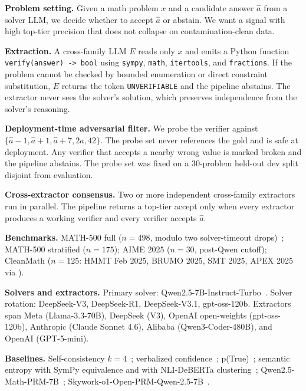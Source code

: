 \documentclass{article}
\begin{document}
\textbf{Problem setting.} Given a math problem $x$ and a candidate answer $\hat a$ from a solver LLM, we decide whether to accept $\hat a$ or abstain. We want a signal with high top-tier precision that does not collapse on contamination-clean data.

\textbf{Extraction.} A cross-family LLM $E$ reads only $x$ and emits a Python function \texttt{verify(answer) -> bool} using \texttt{sympy}, \texttt{math}, \texttt{itertools}, and \texttt{fractions}. If the problem cannot be checked by bounded enumeration or direct constraint substitution, $E$ returns the token \texttt{UNVERIFIABLE} and the pipeline abstains. The extractor never sees the solver's solution, which preserves independence from the solver's reasoning.

\textbf{Deployment-time adversarial filter.} We probe the verifier against $\{\hat a{-}1, \hat a{+}1, \hat a{+}7, 2\hat a, 42\}$. The probe set never references the gold and is safe at deployment. Any verifier that accepts a nearby wrong value is marked broken and the pipeline abstains. The probe set was fixed on a 30-problem held-out dev split disjoint from evaluation.

\textbf{Cross-extractor consensus.} Two or more independent cross-family extractors run in parallel. The pipeline returns a top-tier accept only when every extractor produces a working verifier and every verifier accepts $\hat a$.

\textbf{Benchmarks.} MATH-500 full ($n{=}498$, modulo two solver-timeout drops)~\citep{hendrycks2021math, lightman2024prm}; MATH-500 stratified ($n{=}175$); AIME 2025 ($n{=}30$, post-Qwen cutoff); CleanMath ($n{=}125$: HMMT Feb 2025, BRUMO 2025, SMT 2025, APEX 2025 via \citet{matharena2025}).

\textbf{Solvers and extractors.} Primary solver: Qwen2.5-7B-Instruct-Turbo~\citep{yang2024qwen25math}. Solver rotation: DeepSeek-V3, DeepSeek-R1, DeepSeek-V3.1, gpt-oss-120b. Extractors span Meta (Llama-3.3-70B), DeepSeek (V3), OpenAI open-weights (gpt-oss-120b), Anthropic (Claude Sonnet 4.6), Alibaba (Qwen3-Coder-480B), and OpenAI (GPT-5-mini).

\textbf{Baselines.} Self-consistency $k{=}4$~\citep{wang2023selfconsistency}; verbalized confidence~\citep{xiong2024llmuncertainty}; p(True)~\citep{kadavath2022}; semantic entropy with SymPy equivalence and with NLI-DeBERTa clustering~\citep{kuhn2023semantic, farquhar2024nature}; Qwen2.5-Math-PRM-7B~\citep{qwenprm2025}; Skywork-o1-Open-PRM-Qwen-2.5-7B~\citep{skyworkprm2024}.
\end{document}
